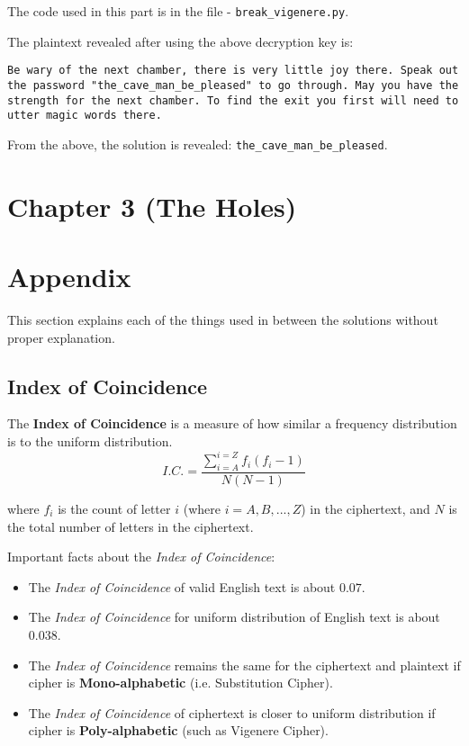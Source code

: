 \documentclass[10pt,twoside]{article}
\begin{document}
The code used in this part is in the file - \texttt{break\_vigenere.py}. \newline

The plaintext revealed after using the above decryption key is: \newline

\texttt{Be wary of the next chamber, there is very little joy there. Speak out the password \newline"the\_cave\_man\_be\_pleased" to go through. May you have the strength for the next chamber. To find the exit you first will need to utter magic words there.} \newline

From the above, the solution is revealed: \texttt{the\_cave\_man\_be\_pleased}.

\newpage
\section{Chapter 3 (The Holes)}

\newpage
\section{Appendix}

This section explains each of the things used in between the solutions without proper explanation.

\subsection{Index of Coincidence} \label{ic}

The \textbf{Index of Coincidence} is a measure of how similar a frequency distribution is to the uniform distribution.
$$ I.C. = \frac{\sum_{i=A}^{i=Z} f_i(f_i-1)}{N(N-1)}$$

where $f_i$ is the count of letter $i$ (where $i = A,B,...,Z$) in the ciphertext, and $N$ is the total number of letters in the ciphertext. \newline

Important facts about the \textit{Index of Coincidence}:
\begin{itemize}
  \setlength\itemsep{0em}
    \item The \textit{Index of Coincidence} of valid English text is about $0.07$.
    \item The \textit{Index of Coincidence} for uniform distribution of English text is about $0.038$.
    \item The \textit{Index of Coincidence} remains the same for the ciphertext and plaintext if cipher is \textbf{Mono-alphabetic} (i.e. Substitution Cipher).
    \item The \textit{Index of Coincidence} of ciphertext is closer to uniform distribution if cipher is \textbf{Poly-alphabetic} (such as Vigenere Cipher).
\end{itemize}
\end{document}
